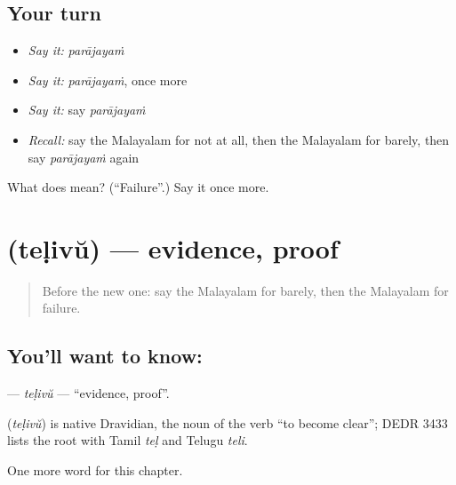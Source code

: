 \subsection*{Your turn}
\begin{itemize}
\raggedright
  \item \emph{Say it:} \emph{parājayaṁ}
  \item \emph{Say it:} \emph{parājayaṁ}, once more
  \item \emph{Say it:} say \emph{parājayaṁ}
  \item \emph{Recall:} say the Malayalam for not at all, then the Malayalam for barely, then say \emph{parājayaṁ} again
\end{itemize}

\begin{tcolorbox}[breakable,colback=teal!4,colframe=teal!35!black,title={Before you move on}]
What does  mean? (\textquotedblleft{}Failure\textquotedblright{}.) Say it once more.
\end{tcolorbox}
\section[\texorpdfstring{\ml{തെളിവ്} (teḷivŭ)}{തെളിവ് (teḷivŭ)}]{ (teḷivŭ) — evidence, proof}

\label{lesson:ML-C318-telivu}



\begin{quote}
Before the new one: say the Malayalam for barely, then the Malayalam for failure.
\end{quote}

\subsection*{You'll want to know: }
\textbf{} — \emph{teḷivŭ} — \textquotedblleft{}evidence, proof\textquotedblright{}.

\begin{cousinweb}
\textbf{} (\emph{teḷivŭ}) is native Dravidian, the noun of the verb \textquotedblleft{}to become clear\textquotedblright{}; DEDR 3433 lists the root with Tamil \emph{teḷ} and Telugu \emph{teli}.
\end{cousinweb}

\begin{grammarlens}[title={What you've built}]
One more word for this chapter.
\end{grammarlens}

